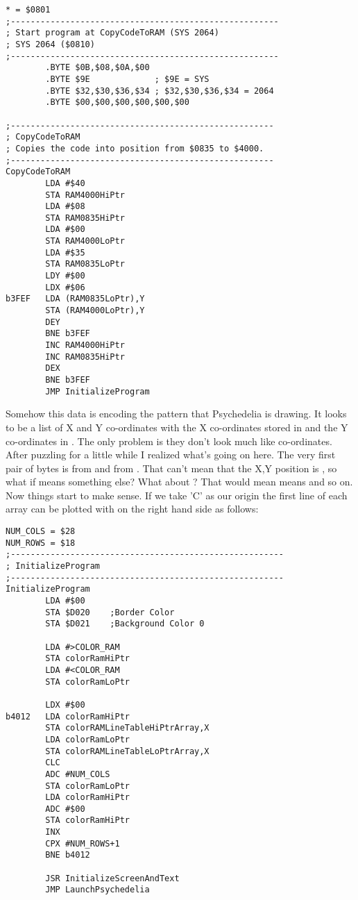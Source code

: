\clearpage
\begin{lstlisting}
* = $0801
;------------------------------------------------------
; Start program at CopyCodeToRAM (SYS 2064)
; SYS 2064 ($0810)
;------------------------------------------------------
        .BYTE $0B,$08,$0A,$00
        .BYTE $9E             ; $9E = SYS
        .BYTE $32,$30,$36,$34 ; $32,$30,$36,$34 = 2064
        .BYTE $00,$00,$00,$00,$00,$00

;-----------------------------------------------------
; CopyCodeToRAM
; Copies the code into position from $0835 to $4000.
;-----------------------------------------------------
CopyCodeToRAM
        LDA #$40
        STA RAM4000HiPtr
        LDA #$08
        STA RAM0835HiPtr
        LDA #$00
        STA RAM4000LoPtr
        LDA #$35
        STA RAM0835LoPtr
        LDY #$00
        LDX #$06
b3FEF   LDA (RAM0835LoPtr),Y
        STA (RAM4000LoPtr),Y
        DEY 
        BNE b3FEF
        INC RAM4000HiPtr
        INC RAM0835HiPtr
        DEX 
        BNE b3FEF
        JMP InitializeProgram
\end{lstlisting}
\clearpage

Somehow this data is encoding the pattern that Psychedelia is drawing. It looks to be a list of X and Y 
co-ordinates with the X co-ordinates stored in  and the Y co-ordinates in
. The only problem is they don't look much like co-ordinates. After puzzling 
for a little while I realized what's going on here. The very first pair of bytes is  from
 and  from . That can't mean that the X,Y
position is , so what if  means something else? What about ? That
would mean  means  and so on. Now things start to make sense. If we take 'C' as our origin the first line of 
each array can be plotted with  on the right hand side as follows:


\clearpage
\begin{lstlisting}
NUM_COLS = $28
NUM_ROWS = $18
;-------------------------------------------------------
; InitializeProgram
;-------------------------------------------------------
InitializeProgram   
        LDA #$00
        STA $D020    ;Border Color
        STA $D021    ;Background Color 0

        LDA #>COLOR_RAM
        STA colorRamHiPtr
        LDA #<COLOR_RAM
        STA colorRamLoPtr

        LDX #$00
b4012   LDA colorRamHiPtr
        STA colorRAMLineTableHiPtrArray,X
        LDA colorRamLoPtr
        STA colorRAMLineTableLoPtrArray,X
        CLC 
        ADC #NUM_COLS
        STA colorRamLoPtr
        LDA colorRamHiPtr
        ADC #$00
        STA colorRamHiPtr
        INX 
        CPX #NUM_ROWS+1
        BNE b4012

        JSR InitializeScreenAndText
        JMP LaunchPsychedelia

\end{lstlisting}
\clearpage

